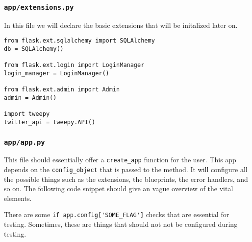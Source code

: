 \documentclass[../main/main.tex]{subfiles}
\begin{document}
\subsubsection{\lstinline|app/extensions.py|}

In this file we will declare the basic extensions that will be
initalized later on. 


\begin{lstlisting}
from flask.ext.sqlalchemy import SQLAlchemy
db = SQLAlchemy()

from flask.ext.login import LoginManager
login_manager = LoginManager()

from flask.ext.admin import Admin
admin = Admin()

import tweepy
twitter_api = tweepy.API()
\end{lstlisting}

\subsubsection{\lstinline|app/app.py|}

This file should essentially offer a \lstinline|create_app| function for
the user. This app depends on the \lstinline|config_object| that is
passed to the method. It will configure all the possible things such as
the extensions, the blueprints, the error handlers, and so on. The
following code snippet should give an vague overview of the vital
elements. 

There are some \lstinline|if app.config['SOME_FLAG']| checks that are
essential for testing. Sometimes, these are things that should not not
be configured during testing. 
\end{document}

